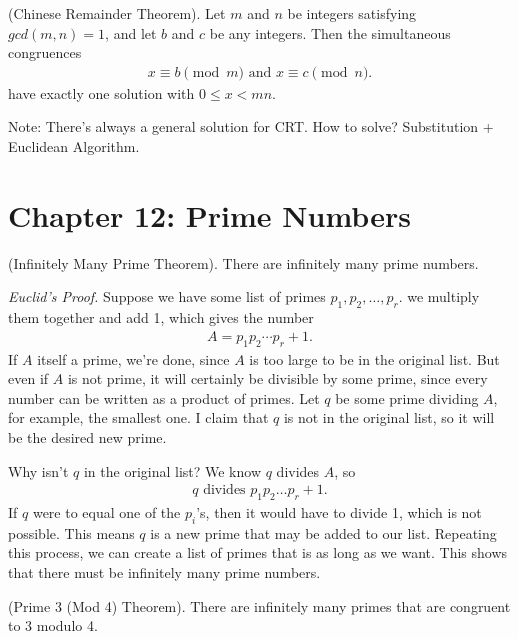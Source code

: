 \documentclass[graybox]{svmult}
\begin{document}
\begin{svgraybox}
\begin{theorem}
(Chinese Remainder Theorem). Let $m$ and $n$ be integers satisfying $gcd(m,n)=1$, and let $b$ and $c$ be any integers. Then the simultaneous congruences
\begin{align*}
x \equiv b \pmod m \text{ and } x \equiv c \pmod n.
\end{align*}
have exactly one solution with $0 \leqslant x < mn$.
\end{theorem}
\end{svgraybox}

Note: There's always a general solution for CRT. How to solve? Substitution + Euclidean Algorithm.

\section*{Chapter 12: Prime Numbers}

\begin{theorem}
(Infinitely Many Prime Theorem). There are infinitely many prime numbers.
\end{theorem}

\textit{Euclid's Proof.} Suppose we have some list of primes $p_1,p_2,\ldots,p_r$. we multiply them together and add 1, which gives the number
\begin{align*}
A = p_1p_2\cdots p_r +1.
\end{align*}
If $A$ itself a prime, we're done, since $A$ is too large to be in the original list. But even if $A$ is not prime, it will certainly be divisible by some prime, since every number can be written as a product of primes. Let $q$ be some prime dividing $A$, for example, the smallest one. I claim that $q$ is not in the original list, so it will be the desired new prime.

Why isn't $q$ in the original list? We know $q$ divides $A$, so
\begin{align*}
q \text{ divides } p_1p_2\ldots p_r +1.
\end{align*}
If $q$ were to equal one of the $p_i$'s, then it would have to divide 1, which is not possible. This means $q$ is a new prime that may be added to our list. Repeating this process, we can create a list of primes that is as long as we want. This shows that there must be infinitely many prime numbers.

\begin{theorem}
(Prime 3 (Mod 4) Theorem). There are infinitely many primes that are congruent to 3 modulo 4.
\end{theorem}
\end{document}
